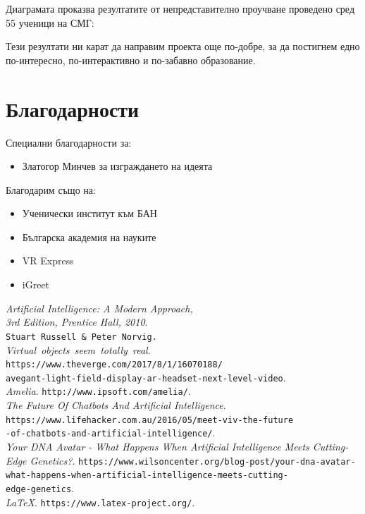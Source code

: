 \documentclass[a4paper, 12pt]{article}
\begin{document}
	Диаграмата проказва резултатите от непредставително проучване проведено сред 55 ученици на СМГ:\\
	\begin{center}
	\end{center}

	Тези резултати ни карат да направим проекта още по-добре, за да постигнем едно по-интересно, по-интерактивно и по-забавно образование.
 	\section{Благодарности}
 	 	 Специални благодарности за:
 	 	 \begin{itemize}
 	 	 	\item Златогор Минчев за изграждането на идеята
 	 	 \end{itemize}
 	 	 Благодарим също на:
 	 	 \begin{itemize}
 	 	 	\item Ученически институт към БАН
 	 	 	\item Българска академия на науките
 	 	 	\item VR Express
 	 	 	\item iGreet
 	 	\end{itemize}
 	 	 \begin{thebibliography}{99}
	{\itshape Artificial Intelligence: A Modern Approach, \\ 3rd Edition, Prentice Hall, 2010}. \\
	\texttt{Stuart Russell \& Peter Norvig.} \\
	\textit{Virtual\ objects\ seem\ totally\ real}.
	\texttt{https://www.theverge.com/2017/8/1/16070188/\\
		avegant-light-field-display-ar-headset-next-level-video}. \\
	{\itshape Amelia}.
	\texttt{http://www.ipsoft.com/amelia/}. \\
	{\itshape The Future Of Chatbots And Artificial Intelligence}.
	\texttt{https://www.lifehacker.com.au/2016/05/meet-viv-the-future\\
		-of-chatbots-and-artificial-intelligence/}. \\
	{\itshape Your DNA Avatar - What Happens When Artificial Intelligence Meets Cutting-Edge Genetics?}.
	\texttt{https://www.wilsoncenter.org/blog-post/your-dna-avatar-\\
		what-happens-when-artificial-intelligence-meets-cutting-\\
		edge-genetics}. \\
	{\itshape \LaTeX}.
	\texttt{https://www.latex-project.org/}.
\end{thebibliography}
\end{document}
